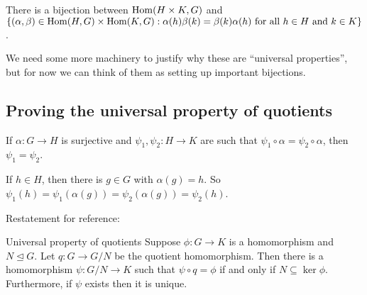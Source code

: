 \documentclass[12pt,letterpaper]{report}
\begin{document}
\begin{center}
\end{center}

\begin{cor}{}{}
  There is a bijection between $\operatorname{Hom}(H \times K, G)$ and
  $\{(\alpha, \beta) \in \operatorname{Hom}(H, G) \times \operatorname{Hom}(K, G) : \alpha(h)\beta(k) = \beta(k)\alpha(h)
    \text{ for all } h \in H \text{ and } k \in K\}$.
\end{cor}

We need some more machinery to justify why these are ``universal properties'', but for now we can
think of them as setting up important bijections.

\pagebreak
\subsection{Proving the universal property of quotients}

\begin{lem}{}{}
  If $\alpha \colon G \to H$ is surjective and $\psi_1, \psi_2 : H \to K$ are such that
  $\psi_1 \circ \alpha = \psi_2 \circ \alpha$, then $\psi_1 = \psi_2$.
\end{lem}

\begin{thmproof}
  If $h \in H$, then there is $g \in G$ with $\alpha(g) = h$.
  So $\psi_1(h) = \psi_1(\alpha(g)) = \psi_2(\alpha(g)) = \psi_2(h)$.
\end{thmproof}

Restatement for reference:

\begin{thm}{Universal property of quotients}{}
  Suppose $\phi \colon G \to K$ is a homomorphism and $N \trianglelefteq G$.
  Let $q \colon G \to G/N$ be the quotient homomorphism.
  Then there is a homomorphism $\psi \colon G/N \to K$ such that $\psi \circ q = \phi$ if and only
  if $N \subseteq \ker\phi$.
  Furthermore, if $\psi$ exists then it is unique.
\end{thm}
\end{document}
